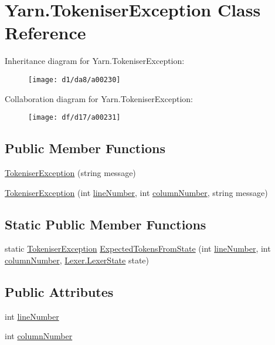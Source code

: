 \hypertarget{a00080}{\section{Yarn.\-Tokeniser\-Exception Class Reference}
\label{a00080}
}


Inheritance diagram for Yarn.\-Tokeniser\-Exception\-:
\nopagebreak
\begin{figure}[H]
\begin{center}
\leavevmode
\texttt{[image: d1/da8/a00230]}
\end{center}
\end{figure}


Collaboration diagram for Yarn.\-Tokeniser\-Exception\-:
\nopagebreak
\begin{figure}[H]
\begin{center}
\leavevmode
\texttt{[image: df/d17/a00231]}
\end{center}
\end{figure}
\subsection*{Public Member Functions}
\begin{DoxyCompactItemize}
\item 
\hyperlink{a00080_ad00fcf742d2b0d476ce43b27a3f3b6c1}{Tokeniser\-Exception} (string message)
\item 
\hyperlink{a00080_aa8674d006a0d29081a7b87bdd8ff2f4f}{Tokeniser\-Exception} (int \hyperlink{a00080_a54b936d7b4f26f88a07a66c5fc1d1ad1}{line\-Number}, int \hyperlink{a00080_aabf2ad38f3984297c1daede9be55e3d6}{column\-Number}, string message)
\end{DoxyCompactItemize}
\subsection*{Static Public Member Functions}
\begin{DoxyCompactItemize}
\item 
static \hyperlink{a00080}{Tokeniser\-Exception} \hyperlink{a00080_af88cfa5eafdee355e1abb67e358497bd}{Expected\-Tokens\-From\-State} (int \hyperlink{a00080_a54b936d7b4f26f88a07a66c5fc1d1ad1}{line\-Number}, int \hyperlink{a00080_aabf2ad38f3984297c1daede9be55e3d6}{column\-Number}, \hyperlink{a00048}{Lexer.\-Lexer\-State} state)
\end{DoxyCompactItemize}
\subsection*{Public Attributes}
\begin{DoxyCompactItemize}
\item 
int \hyperlink{a00080_a54b936d7b4f26f88a07a66c5fc1d1ad1}{line\-Number}
\item 
int \hyperlink{a00080_aabf2ad38f3984297c1daede9be55e3d6}{column\-Number}
\end{DoxyCompactItemize}


